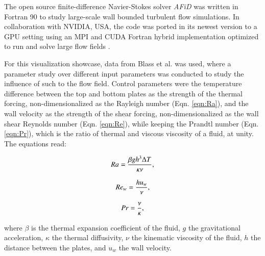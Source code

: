 \documentclass[5p,times]{elsarticle}
\begin{document}
The open source finite-difference Navier-Stokes solver \textit{AFiD} \cite{poe15c} was written in Fortran 90 to study large-scale wall bounded turbulent flow simulations. In collaboration with NVIDIA, USA, the code was ported in its newest version to a GPU setting using an MPI and CUDA Fortran hybrid implementation optimized to run and solve large flow fields \cite{zhu18b}.

For this visualization showcase, data from Blass et al. \cite{bla18} was used, where a parameter study over different input parameters was conducted to study the influence of such to the flow field. Control parameters were the temperature difference between the top and bottom plates as the strength of the thermal forcing, non-dimensionalized as the Rayleigh number (Eqn. \ref{eqn:Ra}), and the wall velocity as the strength of the shear forcing, non-dimensionalized as the wall shear Reynolds number (Eqn. \ref{eqn:Re}), while keeping the Prandtl number (Eqn. \ref{eqn:Pr}), which is the ratio of thermal and viscous viscosity of a fluid, at unity. The equations read:

\begin{equation} %
Ra= \frac{\beta gh^3\Delta T}{\kappa\nu}, 
\label{eqn:Ra} \\[8pt]
\end{equation}

\begin{equation} %
Re_w= \frac{hu_w}{\nu},
\label{eqn:Re} \\[8pt]
\end{equation}

\begin{equation} %
Pr= \frac{\nu}{\kappa},
\label{eqn:Pr} \\[8pt]
\end{equation}


where $ \beta $ is the thermal expansion coefficient of the fluid, $ g $ the
gravitational acceleration, $ \kappa $ the thermal diffusivity, $ \nu $ the
kinematic viscosity of the fluid, $ h $ the distance between the plates, and
$ u_w $ the wall velocity.
\end{document}
